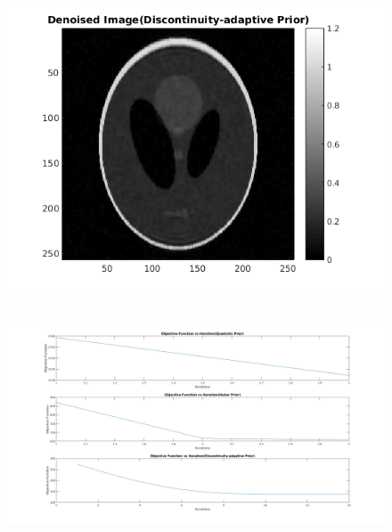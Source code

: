 \documentclass[11pt]{article}
\begin{document}
\begin{figure}[h]
\includegraphics[scale=0.5]{DenoisedDA}
\centering
\end{figure}
\FloatBarrier

\subsection{}
\begin{figure}[h]
\hspace*{-1.5in}
\includegraphics[scale=0.48]{graphs}
\centering
\end{figure}
\FloatBarrier
\end{document}
